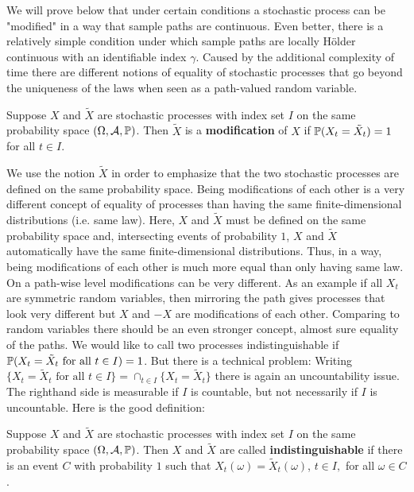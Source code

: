 We will prove below that under certain conditions a stochastic process can be "modified"{} in a way that sample paths are continuous. Even better, there is a relatively simple condition under which sample paths are locally H\"older continuous with an identifiable index $\gamma$. Caused by the additional complexity of time there are different notions of equality of stochastic processes that go beyond the uniqueness of the laws when seen as a path-valued random variable. 
\begin{ldef}
	\begin{deff}
		Suppose $X$ and $\tilde X$ are stochastic processes with index set $I$ on the same probability space $(\Omega, \mathcal A, \P)$. Then $\tilde X$ is a \textbf{modification} of $X$ if $\P(X_t=\tilde X_t)=1$ for all $t\in I$. 
	\end{deff}
\end{ldef}
We use the notion $\tilde X$ in order to emphasize that the two stochastic processes are defined on the same probability space. Being modifications of each other is a very different concept of equality of processes than having the same finite-dimensional distributions (i.e. same law). Here, $X$ and $\tilde X$ must be defined on the same probability space and, intersecting events of probability $1$, $X$ and $\tilde X$ automatically have the same finite-dimensional distributions. Thus, in a way, being modifications of each other is much more equal than only having same law. On a path-wise level modifications can be very different. As an example if all $X_t$ are symmetric random variables, then mirroring the path gives processes that look very different but $X$ and $-X$ are modifications of each other. Comparing to random variables there should be an even stronger concept, almost sure equality of the paths. We would like to call two processes indistinguishable if $\P(X_t=\tilde X_t\text{ for all }t\in I)=1$. But there is a technical problem: Writing $\{X_t=\tilde X_t\text{ for all }t\in I\}=\cap_{t\in I}\{X_t=\tilde X_t\}$ there is again an uncountability issue. The righthand side is measurable if $I$ is countable, but not necessarily if $I$ is uncountable. Here is the good definition:
\begin{ldef}
	\begin{deff}
		Suppose $X$ and $\tilde X$ are stochastic processes with index set $I$ on the same probability space $(\Omega, \mathcal A, \P)$. Then $X$ and $\tilde X$ are called \textbf{indistinguishable} if there is an event $C$ with probability $1$ such that $X_t(\omega)=\tilde X_t(\omega)$, $t\in I,$ for all $\omega\in C$.
	\end{deff}
\end{ldef}
